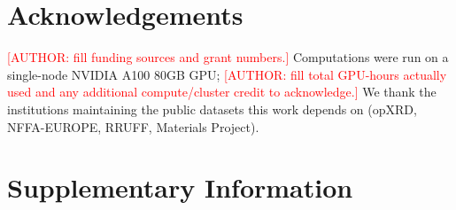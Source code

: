 \documentclass[pdflatex,sn-nature]{sn-jnl}
\newcommand{\redflag}[1]{\textcolor{red}{[#1]}}
\begin{document}
\section*{Acknowledgements}
\redflag{AUTHOR: fill funding sources and grant numbers.} Computations were run on a
single-node NVIDIA A100 80GB GPU;
\redflag{AUTHOR: fill total GPU-hours actually used and any additional compute/cluster
credit to acknowledge.} We thank the institutions maintaining the public datasets this
work depends on (opXRD, NFFA-EUROPE, RRUFF, Materials Project).

\section*{Supplementary Information}
\end{document}
